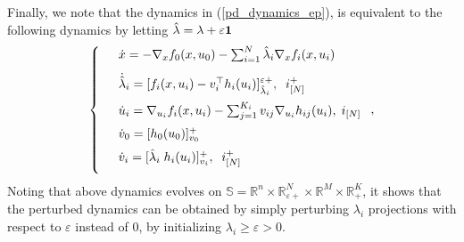 \documentclass[journal,twoside,web]{ieeecolor}
\begin{document}
Finally, we note that the dynamics in (\ref{pd_dynamics_ep}), is equivalent to the following dynamics by letting $\hat{\lambda}=\lambda+\varepsilon {\bf 1}$ 
\begin{align} \label{pd_dynamics_0}
\left\{
\begin{array}{cl}
\vspace{3mm}
&\dot x=-\nabla_x f_0(x,u_0)-\sum_{i=1}^N\hat{\lambda}_i \nabla_x f_i(x,u_i)\\
\vspace{2mm}
&\dot{\hat{\lambda}}_i=[f_i(x,u_i)-v_i^\top h_i(u_i)]_{\hat{\lambda}_i}^{\varepsilon +},\;\; i^+_{[N]}\\
\vspace{2mm}
&\dot u_i=\nabla_{u_i}f_i(x,u_i)-\sum_{j=1}^{K_i} v_{ij} \nabla_{u_i} h_{ij}(u_i),\; i_{[N]}\\
\vspace{2mm}
&\dot{v}_0=[h_0(u_0)]_{v_0}^+\\
\vspace{2mm}
&\dot v_i=[\hat{\lambda}_i \; h_i(u_i)]_{v_i}^+,\;\;i^+_{[N]}
\end{array}\right.,
\end{align}
Noting that above dynamics evolves on $\mathbb{S}= \mathbb{R}^n \times \mathbb{R}^N_{\varepsilon +} \times \mathbb{R}^M \times \mathbb{R}^K_+$, it shows that the perturbed dynamics can be obtained by simply perturbing $\lambda_i$ projections with respect to $\varepsilon$ instead of $0$, by initializing $\lambda_i \geq \varepsilon > 0$.
\end{document}
